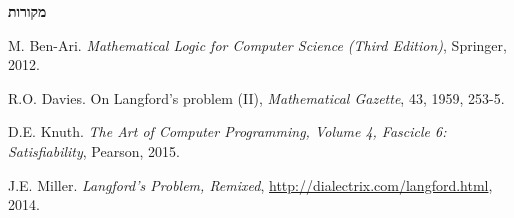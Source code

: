 \documentclass[12pt,a4paper]{article}
\begin{document}
\bigskip

\textbf{\Large
 מקורות
}

\begin{small}
M. Ben-Ari. \textit{Mathematical Logic for Computer Science (Third Edition)}, Springer, 2012.

R.O. Davies. On Langford's problem (II), \textit{Mathematical Gazette}, 43, 1959, 253-5.

D.E. Knuth. \textit{The Art of Computer Programming, Volume 4, Fascicle 6: Satisfiability}, Pearson, 2015.

J.E. Miller. \textit{Langford's Problem, Remixed}, \url{http://dialectrix.com/langford.html}, 2014.

\end{small}
\end{document}
